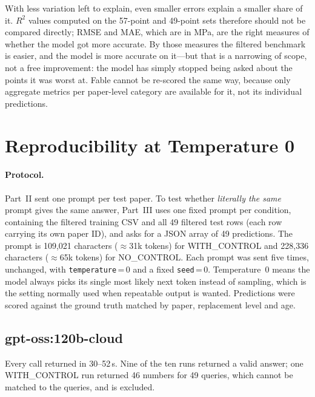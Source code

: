 \documentclass[11pt]{article}
\newcommand{\R}{$R^2$}
\begin{document}
\noindent With less variation left to explain, even smaller errors explain a smaller
share of it. \R{} values computed on the 57-point and 49-point sets therefore should
not be compared directly; RMSE and MAE, which are in MPa, are the right measures of
whether the model got more accurate. By those measures the filtered benchmark is
easier, and the model is more accurate on it---but that is a narrowing of scope, not a
free improvement: the model has simply stopped being asked about the points it was
worst at. Fable cannot be re-scored the same way, because only aggregate metrics per
paper-level category are available for it, not its individual predictions.

\section{Reproducibility at Temperature 0}
\label{sec:part3-repro}

\paragraph{Protocol.} Part~II sent one prompt per test paper. To test whether
\emph{literally the same} prompt gives the same answer, Part~III uses one fixed prompt
per condition, containing the filtered training CSV and all 49 filtered test rows (each
row carrying its own paper ID), and asks for a JSON array of 49 predictions. The prompt
is 109{,}021 characters ($\approx$31k tokens) for WITH\_CONTROL and 228{,}336 characters
($\approx$65k tokens) for NO\_CONTROL. Each prompt was sent five times, unchanged, with
\texttt{temperature}\,=\,0 and a fixed \texttt{seed}\,=\,0. Temperature~0 means the
model always picks its single most likely next token instead of sampling, which is the
setting normally used when repeatable output is wanted. Predictions were scored against
the ground truth matched by paper, replacement level and age.

\subsection{gpt-oss:120b-cloud}
Every call returned in 30--52\,s. Nine of the ten runs returned a valid answer; one
WITH\_CONTROL run returned 46 numbers for 49 queries, which cannot be matched to the
queries, and is excluded.
\end{document}
